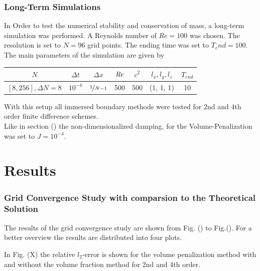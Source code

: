 \subsubsection{Long-Term Simulations}

In Order to test the  numerical stability and conservation of mass, a long-term simulation was performed.
A Reynolds number of $Re=100$ was chosen. The resolution is set to $N=96$ grid points.
The ending time was set to $T_end=100$.
The main parameters of the simulation are  given by

\begin{center}
\vspace*{0.7ex}
\begin{tabular}{c|c|c|c|c|c|c }
 $ N  $                   & $\Delta t$ & $\Delta x$            & $\mbox{\textit{Re}}$  & $c^2$   & $l_x, l_y, l_z$ & $T_{end}$\\
\hline
 $[8, 256], \Delta N = 8 $& $10^{-4}$ & $\nicefrac{1}{N - 1}$ & 500     & $500$   & (1, 1, 1)       & 10\\
\end{tabular}
\vspace*{0.7ex}
\end{center}

With this setup all immersed boundary methods were tested for 2nd and 4th order finite difference schemes.\\
Like in section () the non-dimensionalized damping, for the Volume-Penalization was set to $J=10^{-4}$.

\clearpage

\section{Results}

\subsubsection{Grid Convergence Study with comparsion to the Theoretical Solution}

The results of the grid convergence study are shown from Fig. () to Fig.().
For a better overview the results are distributed into four plots.

In Fig. (X) the relative $l_2$-error is shown for the volume penalization method with and without the volume fraction method
for 2nd and 4th order.

